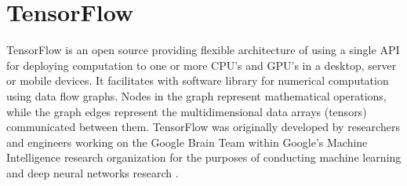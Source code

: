 \section{TensorFlow}
TensorFlow is an open source providing flexible architecture of using a single API for deploying computation to one or more CPU’s and GPU’s in a desktop, server or mobile devices. It facilitates with software library for numerical computation using data flow graphs. Nodes in the graph represent mathematical operations, while the graph edges represent the multidimensional data arrays (tensors) communicated between them. TensorFlow was originally developed by researchers and engineers working on the Google Brain Team within Google's Machine Intelligence research organization for the purposes of conducting machine learning and deep neural networks research \cite{TensorFlow}.
